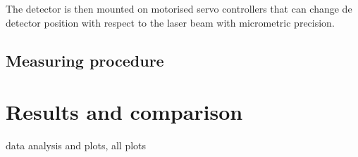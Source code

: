 The detector is then mounted on motorised servo controllers that can change de detector position with respect to the laser beam with micrometric precision.

\subsection{Measuring procedure} 









\section{Results and comparison} %
\label{sec:future_projection}

data analysis and plots, all plots 


